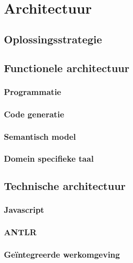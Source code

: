 
\chapter{Architectuur}
\label{chapter:architectuur}

\TODO

\section{Oplossingsstrategie}

\TODO

\section{Functionele architectuur}

\TODO

\subsection{Programmatie}

\TODO

\subsection{Code generatie}

\TODO

\subsection{Semantisch model}

\TODO

\subsection{Domein specifieke taal}

\TODO

\section{Technische architectuur}

\TODO

\subsection{Javascript}

\TODO

\subsection{ANTLR}

\TODO

\subsection{Ge\"integreerde werkomgeving}

\TODO

